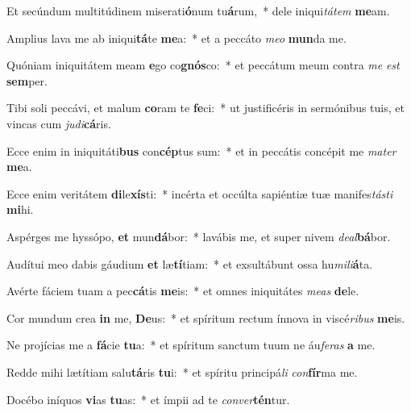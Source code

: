 \item Et secúndum multitúdinem miserati\textbf{ó}num tu\textbf{á}rum,~* dele iniqui\textit{tá}\textit{tem} \textbf{me}am.

\item Amplius lava me ab iniqui\textbf{tá}te \textbf{me}a:~* et a peccáto \textit{me}\textit{o} \textbf{mun}da me.

\item Quóniam iniquitátem meam \textbf{e}go co\textbf{gnós}co:~* et peccátum meum contra \textit{me} \textit{est} \textbf{sem}per.

\item Tibi soli peccávi, et malum \textbf{co}ram te \textbf{fe}ci:~* ut justificéris in sermónibus tuis, et vincas cum \textit{ju}\textit{di}\textbf{cá}ris.

\item Ecce enim in iniquitáti\textbf{bus} con\textbf{cép}tus sum:~* et in peccátis concépit me \textit{ma}\textit{ter} \textbf{me}a.

\item Ecce enim veritátem \textbf{di}le\textbf{xís}ti:~* incérta et occúlta sapiéntiæ tuæ manifes\textit{tás}\textit{ti} \textbf{mi}hi.

\item Aspérges me hyssópo, \textbf{et} mun\textbf{dá}bor:~* lavábis me, et super nivem \textit{de}\textit{al}\textbf{bá}bor.

\item Audítui meo dabis gáudium \textbf{et} læ\textbf{tí}tiam:~* et exsultábunt ossa hu\textit{mi}\textit{li}\textbf{á}ta.

\item Avérte fáciem tuam a pec\textbf{cá}tis \textbf{me}is:~* et omnes iniquitátes \textit{me}\textit{as} \textbf{de}le.

\item Cor mundum crea \textbf{in} me, \textbf{De}us:~* et spíritum rectum ínnova in viscé\textit{ri}\textit{bus} \textbf{me}is.

\item Ne projícias me a \textbf{fá}cie \textbf{tu}a:~* et spíritum sanctum tuum ne áu\textit{fe}\textit{ras} \textbf{a} me.

\item Redde mihi lætítiam salu\textbf{tá}ris \textbf{tu}i:~* et spíritu principá\textit{li} \textit{con}\textbf{fír}ma me.

\item Docébo iníquos \textbf{vi}as \textbf{tu}as:~* et ímpii ad te \textit{con}\textit{ver}\textbf{tén}tur.

